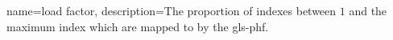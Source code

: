 {
    name={load factor},
    description={The proportion of indexes between $1$ and the maximum index which are mapped to by the \gls*{gls-phf}.}
}

